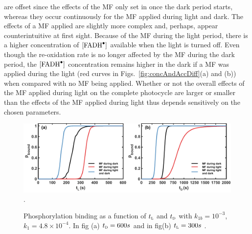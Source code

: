 \documentclass[twoside,twocolumn,9pt]{article}
\begin{document}
are offset since the effects of the MF only set in once the dark period starts, whereas they occur continuously for the MF applied
during light and dark. The effects of a MF applied are slightly more complex and, perhaps, appear counterintuitive at first sight.
Because of the MF during the light period, there is a higher concentration of $[\ce{FADH^{.}}]$ available when the light is turned
off. Even though the re-oxidation rate is no longer affected by the MF during the dark period, the $[\ce{FADH^{.}}]$ concentration
remains higher in the dark if a MF was applied during the light (red curves in Figs.~\ref{fig:concAndAccDiff}(a) and (b)) when
compared with no MF being applied. Whether or not the overall effects of the MF applied during light on the complete photocycle are
larger or smaller than the effects of the MF applied during light thus depends sensitively on the chosen parameters.

\begin{figure}[h]
	\centering
	\includegraphics{varyT1T2.pdf}.
	\caption{Phosphorylation binding as a function of $t_{\textsc{l}}$ and $t_{\textsc{d}}$ with $k_{1b} = 10^{-3}$, $k_{1} = 4.8
	\times 10^{-4}$. In fig (a) $t_{\textsc{d}} = 600s$ and in fig(b) $t_{\textsc{l}} = 300s$ .}
	\label{fig:varyT1T2}
\end{figure}
\end{document}
